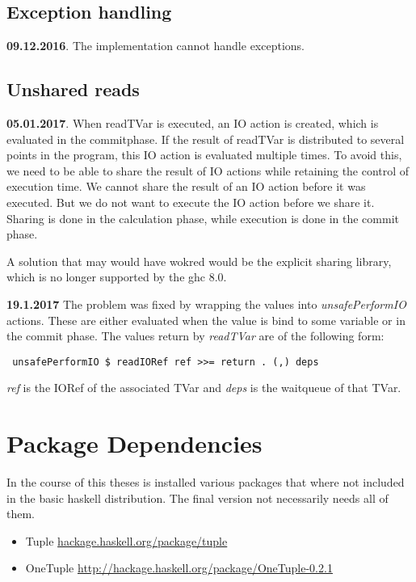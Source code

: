 \documentclass[a4paper,10pt]{article}
\begin{document}
\subsection{Exception handling}
\textbf{09.12.2016}. The implementation cannot handle exceptions.


\subsection{Unshared reads}
\textbf{05.01.2017}. When readTVar is executed, an IO action is created, which is evaluated in the commitphase. If the result of 
readTVar is distributed to several points in the program, this IO action is evaluated multiple times. To avoid this, we need to be
able to share the result of IO actions while retaining the control of execution time. We cannot share the result of an IO action
before it was executed. But we do not want to execute the IO action before we share it. Sharing is done in the calculation phase,
while execution is done in the commit phase.

A solution that may would have wokred would be the explicit sharing library, which is no longer supported by the ghc 8.0.

\textbf{19.1.2017}
The problem was fixed by wrapping the values into \textit{unsafePerformIO} actions. These are either evaluated when the 
value is bind to some variable or in the commit phase. The values return by \textit{readTVar} are of the following form:
\begin{lstlisting}
 unsafePerformIO $ readIORef ref >>= return . (,) deps
\end{lstlisting}
\textit{ref} is the IORef of the associated TVar and \textit{deps} is the waitqueue of that TVar.

\section{Package Dependencies}
In the course of this theses is installed various packages that where not included in the basic haskell distribution.
The final version not necessarily needs all of them.
\begin{itemize}
 \item Tuple \url{hackage.haskell.org/package/tuple}
 \item OneTuple \url{http://hackage.haskell.org/package/OneTuple-0.2.1}
\end{itemize}




\end{document}
